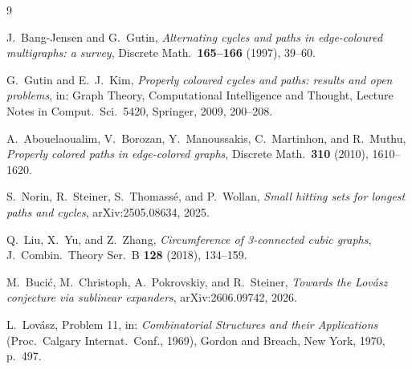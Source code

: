 \documentclass[11pt]{article}
\theoremstyle{definition}
\begin{document}
\begin{thebibliography}{9}

J.~Bang-Jensen and G.~Gutin,
\emph{Alternating cycles and paths in edge-coloured multigraphs: a survey},
Discrete Math.\ \textbf{165--166} (1997), 39--60.

G.~Gutin and E.~J.~Kim,
\emph{Properly coloured cycles and paths: results and open problems},
in: Graph Theory, Computational Intelligence and Thought,
Lecture Notes in Comput.\ Sci.\ 5420, Springer, 2009, 200--208.

A.~Abouelaoualim, V.~Borozan, Y.~Manoussakis, C.~Martinhon, and R.~Muthu,
\emph{Properly colored paths in edge-colored graphs},
Discrete Math.\ \textbf{310} (2010), 1610--1620.

S.~Norin, R.~Steiner, S.~Thomass\'e, and P.~Wollan,
\emph{Small hitting sets for longest paths and cycles},
arXiv:2505.08634, 2025.

Q.~Liu, X.~Yu, and Z.~Zhang,
\emph{Circumference of 3-connected cubic graphs},
J.~Combin.\ Theory Ser.~B \textbf{128} (2018), 134--159.

M.~Buci\'c, M.~Christoph, A.~Pokrovskiy, and R.~Steiner,
\emph{Towards the Lov\'asz conjecture via sublinear expanders},
arXiv:2606.09742, 2026.

L.~Lov\'asz,
Problem 11, in:
\emph{Combinatorial Structures and their Applications}
(Proc.\ Calgary Internat.\ Conf., 1969),
Gordon and Breach, New York, 1970, p.~497.

\end{thebibliography}
\end{document}
